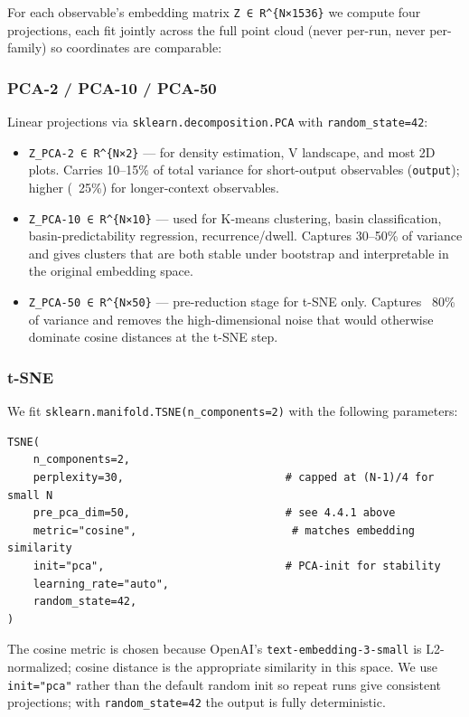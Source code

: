 \documentclass{article}
\theoremstyle{plain}
\theoremstyle{definition}
\begin{document}
For each observable's embedding matrix \texttt{Z ∈ R\textasciicircum{}\{N×1536\}} we compute four
projections, each fit jointly across the full point cloud (never
per-run, never per-family) so coordinates are comparable:

\subsubsection{PCA-2 / PCA-10 / PCA-50}

Linear projections via \texttt{sklearn.decomposition.PCA} with
\texttt{random\_state=42}:

\begin{itemize}
  \item \texttt{Z\_PCA-2 ∈ R\textasciicircum{}\{N×2\}} — for density estimation, V landscape, and most
  2D plots. Carries 10–15\% of total variance for short-output observables
  (\texttt{output}); higher (~25\%) for longer-context observables.
  \item \texttt{Z\_PCA-10 ∈ R\textasciicircum{}\{N×10\}} — used for K-means clustering, basin
  classification, basin-predictability regression, recurrence/dwell.
  Captures 30–50\% of variance and gives clusters that are both stable
  under bootstrap and interpretable in the original embedding space.
  \item \texttt{Z\_PCA-50 ∈ R\textasciicircum{}\{N×50\}} — pre-reduction stage for t-SNE only. Captures
  ~80\% of variance and removes the high-dimensional noise that would
  otherwise dominate cosine distances at the t-SNE step.
\end{itemize}

\subsubsection{t-SNE}

We fit \texttt{sklearn.manifold.TSNE(n\_components=2)} with the following
parameters:

\begin{verbatim}
TSNE(
    n_components=2,
    perplexity=30,                         # capped at (N-1)/4 for small N
    pre_pca_dim=50,                        # see 4.4.1 above
    metric="cosine",                        # matches embedding similarity
    init="pca",                            # PCA-init for stability
    learning_rate="auto",
    random_state=42,
)
\end{verbatim}

The cosine metric is chosen because OpenAI's \texttt{text-embedding-3-small}
is L2-normalized; cosine distance is the appropriate similarity in this
space. We use \texttt{init="pca"} rather than the default random init so
repeat runs give consistent projections; with \texttt{random\_state=42} the
output is fully deterministic.
\end{document}

